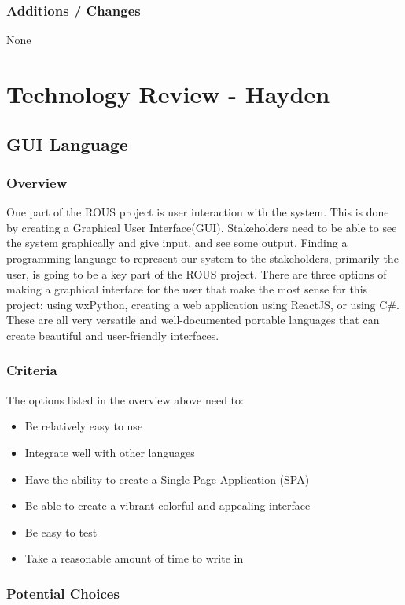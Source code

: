 \documentclass[draftclsnofoot, onecolumn, compsoc, 10pt]{IEEEtran}
\begin{document}
\subsubsection{Additions / Changes}
None

\newpage
\section{Technology Review - Hayden}
\subsection{GUI Language}
\subsubsection{Overview}
One part of the ROUS project is user interaction with the system. This is done by creating a Graphical User Interface(GUI). Stakeholders need to be able to see the system graphically and give input, and see some output. Finding a programming language to represent our system to the stakeholders, primarily the user, is going to be a key part of the ROUS project. There are three options of making a graphical interface for the user that make the most sense for this project: using wxPython, creating a web application using ReactJS, or using C\#. These are all very versatile and well-documented portable languages that can create beautiful and user-friendly interfaces.


\subsubsection{Criteria}
The options listed in the overview above need to:
\begin{itemize}
	\item Be relatively easy to use
    \item Integrate well with other languages
    \item Have the ability to create a Single Page Application (SPA)
    \item Be able to create a vibrant colorful and appealing interface
    \item Be easy to test
    \item Take a reasonable amount of time to write in
\end{itemize}
\subsubsection{Potential Choices}
\end{document}
